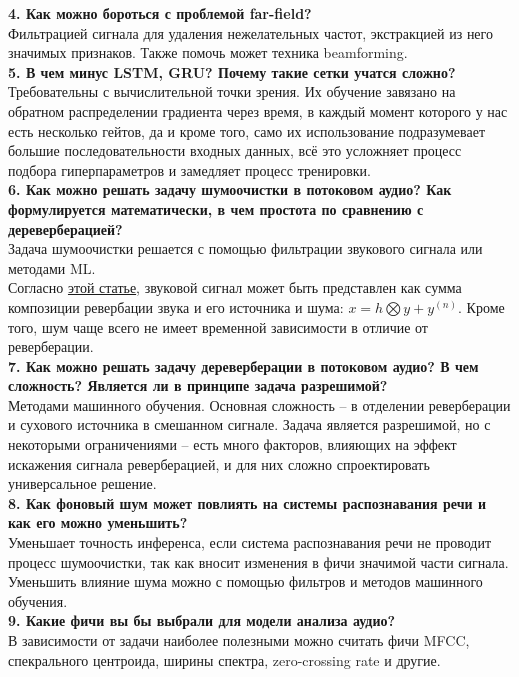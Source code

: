 \documentclass[12pt]{article}
\begin{document}
\textbf{4. Как можно бороться с проблемой far-field?}\\
Фильтрацией сигнала для удаления нежелательных частот, экстракцией из него значимых признаков. Также помочь может техника beamforming.\\

\textbf{5. В чем минус LSTM, GRU? Почему такие сетки учатся сложно?}\\
Требовательны с вычислительной точки зрения. Их обучение завязано на обратном распределении градиента через время, в каждый момент которого у нас есть несколько гейтов, да и кроме того, само их использование подразумевает большие последовательности входных данных, всё это усложняет процесс подбора гиперпараметров и замедляет процесс тренировки.\\

\textbf{6. Как можно решать задачу шумоочистки в потоковом аудио? Как формулируется математически, в чем простота по сравнению с дереверберацией?}\\
Задача шумоочистки решается с помощью фильтрации звукового сигнала или методами ML.\\
Согласно \href{https://arxiv.org/pdf/2102.03207}{этой статье}, звуковой сигнал может быть представлен как сумма композиции ревербации звука и его источника и шума: $x = h \bigotimes y + y^{(n)}$. Кроме того, шум чаще всего не имеет временной зависимости в отличие от реверберации.\\

\textbf{7. Как можно решать задачу дереверберации в потоковом аудио? В чем сложность? Является ли в принципе задача разрешимой?}\\
Методами машинного обучения. Основная сложность -- в отделении реверберации и сухового источника в смешанном сигнале. Задача является разрешимой, но с некоторыми ограничениями -- есть много факторов, влияющих на эффект искажения сигнала реверберацией, и для них сложно спроектировать универсальное решение.\\

\textbf{8. Как фоновый шум может повлиять на системы распознавания речи и как его можно уменьшить?}\\
Уменьшает точность инференса, если система распознавания речи не проводит процесс шумоочистки, так как вносит изменения в фичи значимой части сигнала. Уменьшить влияние шума можно с помощью фильтров и методов машинного обучения.\\

\textbf{9. Какие фичи вы бы выбрали для модели анализа аудио?}\\
В зависимости от задачи наиболее полезными можно считать фичи MFCC, спекрального центроида, ширины спектра, zero-crossing rate и другие.\\
\end{document}
